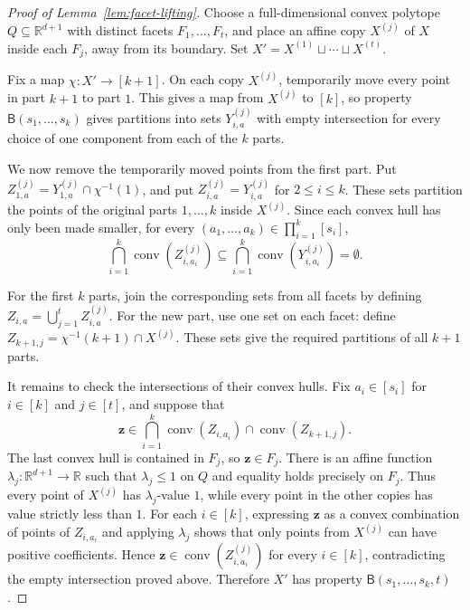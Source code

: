 \documentclass[11pt]{article}
\theoremstyle{definition}
\newcommand{\R}{\mathbb{R}}
\begin{document}
\begin{proof}[Proof of Lemma~\ref{lem:facet-lifting}]
Choose a full-dimensional convex polytope \(Q\subseteq\R^{d+1}\) with distinct facets \(F_{1},\ldots,F_{t}\), and place an affine copy \(X^{(j)}\) of \(X\) inside each \(F_{j}\), away from its boundary. Set \(X'=X^{(1)}\sqcup\cdots\sqcup X^{(t)}\).

Fix a map \(\chi:X'\to[k+1]\). On each copy \(X^{(j)}\), temporarily move every point in part \(k+1\) to part \(1\). This gives a map from \(X^{(j)}\) to \([k]\), so property \(\mathsf{B}(s_{1},\ldots,s_{k})\) gives partitions into sets \(Y^{(j)}_{i,a}\) with empty intersection for every choice of one component from each of the \(k\) parts.

We now remove the temporarily moved points from the first part. Put \(Z^{(j)}_{1,a}=Y^{(j)}_{1,a}\cap\chi^{-1}(1)\), and put \(Z^{(j)}_{i,a}=Y^{(j)}_{i,a}\) for \(2\le i\le k\). These sets partition the points of the original parts \(1,\ldots,k\) inside \(X^{(j)}\). Since each convex hull has only been made smaller, for every \((a_{1},\ldots,a_{k})\in\prod_{i=1}^{k}[s_{i}]\),
\[
\bigcap_{i=1}^{k}\operatorname{conv}(Z^{(j)}_{i,a_{i}})\subseteq\bigcap_{i=1}^{k}\operatorname{conv}(Y^{(j)}_{i,a_{i}})=\emptyset.
\]

For the first \(k\) parts, join the corresponding sets from all facets by defining \(Z_{i,a}=\bigcup_{j=1}^{t}Z^{(j)}_{i,a}\). For the new part, use one set on each facet: define \(Z_{k+1,j}=\chi^{-1}(k+1)\cap X^{(j)}\). These sets give the required partitions of all \(k+1\) parts.

It remains to check the intersections of their convex hulls. Fix \(a_{i}\in[s_{i}]\) for \(i\in[k]\) and \(j\in[t]\), and suppose that
\[
\boldsymbol{z}\in\bigcap_{i=1}^{k}\operatorname{conv}(Z_{i,a_{i}})\cap\operatorname{conv}(Z_{k+1,j}).
\]
The last convex hull is contained in \(F_{j}\), so \(\boldsymbol{z}\in F_{j}\). There is an affine function \(\lambda_{j}:\R^{d+1}\to\R\) such that \(\lambda_{j}\le1\) on \(Q\) and equality holds precisely on \(F_{j}\). Thus every point of \(X^{(j)}\) has \(\lambda_{j}\)-value \(1\), while every point in the other copies has value strictly less than \(1\). For each \(i\in[k]\), expressing \(\boldsymbol{z}\) as a convex combination of points of \(Z_{i,a_{i}}\) and applying \(\lambda_{j}\) shows that only points from \(X^{(j)}\) can have positive coefficients. Hence \(\boldsymbol{z}\in\operatorname{conv}(Z^{(j)}_{i,a_{i}})\) for every \(i\in[k]\), contradicting the empty intersection proved above. Therefore \(X'\) has property \(\mathsf{B}(s_{1},\ldots,s_{k},t)\).
\end{proof}
\end{document}
